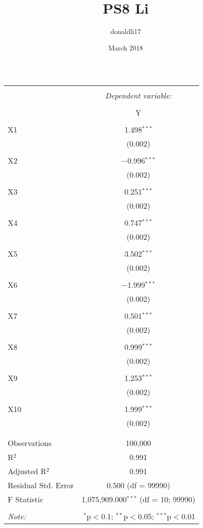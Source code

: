 \documentclass{article}
\title{PS8 Li}
\author{donaldli17 }
\date{March 2018}
\begin{document}
\begin{table}[!htbp] \centering 
  \caption{} 
  \label{} 
\begin{tabular}{@{\extracolsep{5pt}}lc} 
\\[-1.8ex]\hline 
\hline \\[-1.8ex] 
 & \multicolumn{1}{c}{\textit{Dependent variable:}} \\ 
\cline{2-2} 
\\[-1.8ex] & Y \\ 
\hline \\[-1.8ex] 
 X1 & 1.498$^{***}$ \\ 
  & (0.002) \\ 
  & \\ 
 X2 & $-$0.996$^{***}$ \\ 
  & (0.002) \\ 
  & \\ 
 X3 & 0.251$^{***}$ \\ 
  & (0.002) \\ 
  & \\ 
 X4 & 0.747$^{***}$ \\ 
  & (0.002) \\ 
  & \\ 
 X5 & 3.502$^{***}$ \\ 
  & (0.002) \\ 
  & \\ 
 X6 & $-$1.999$^{***}$ \\ 
  & (0.002) \\ 
  & \\ 
 X7 & 0.501$^{***}$ \\ 
  & (0.002) \\ 
  & \\ 
 X8 & 0.999$^{***}$ \\ 
  & (0.002) \\ 
  & \\ 
 X9 & 1.253$^{***}$ \\ 
  & (0.002) \\ 
  & \\ 
 X10 & 1.999$^{***}$ \\ 
  & (0.002) \\ 
  & \\ 
\hline \\[-1.8ex] 
Observations & 100,000 \\ 
R$^{2}$ & 0.991 \\ 
Adjusted R$^{2}$ & 0.991 \\ 
Residual Std. Error & 0.500 (df = 99990) \\ 
F Statistic & 1,075,909.000$^{***}$ (df = 10; 99990) \\ 
\hline 
\hline \\[-1.8ex] 
\textit{Note:}  & \multicolumn{1}{r}{$^{*}$p$<$0.1; $^{**}$p$<$0.05; $^{***}$p$<$0.01} \\ 
\end{tabular} 
\end{table} 
\end{document}
